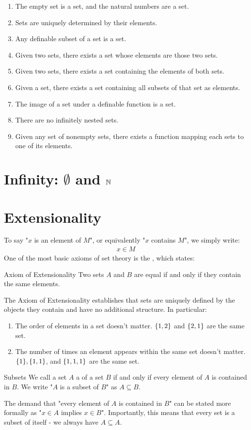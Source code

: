 \begin{enumerate}
	\item The empty set is a set, and the natural numbers are a set.
	\item Sets are uniquely determined by their elements.
	\item Any definable subset of a set is a set.
	\item Given two sets, there exists a set whose elements are those two sets.
	\item Given two sets, there exists a set containing the elements of both sets.
	\item Given a set, there exists a set containing all subsets of that set as elements.
	\item The image of a set under a definable function is a set.
	\item There are no infinitely nested sets.
	\item Given any set of nonempty sets, there exists a function mapping each sets to one of its elements.
\end{enumerate}
\section{Infinity: $\emptyset$ and $\mathbb{N}$}
\section{Extensionality}
To say "$x$ is an element of $M$", or equivalently "$x$ contains $M$", we simply write:
\begin{align*}
	x \in M
\end{align*}
One of the most basic axioms of set theory is the , which states:
\begin{axiom}{Axiom of Extensionality}{}
	Two sets $A$ and $B$ are equal if and only if they contain the same elements.
\end{axiom}
The Axiom of Extensionality establishes that sets are uniquely defined by the objects they contain and have no additional structure. In particular:
\begin{enumerate}
	\item The order of elements in a set doesn't matter. $\qty{1,2}$ and $\qty{2,1}$ are the same set.
	\item The number of times an element appears within the same set doesn't matter. $\qty{1}, \qty{1,1}$, and $\qty{1,1,1}$ are the same set.
\end{enumerate}
\begin{importantdefinition}{Subsets}{}
	We call a set $A$ a  of a set $B$ if and only if every element of $A$ is contained in $B$. We write "$A$ is a subset of $B$" as $A \subseteq B$.
\end{importantdefinition}
The demand that "every element of $A$ is contained in $B$" can be stated more formally as "$x \in A$ implies $x \in B$". Importantly, this means that every set is a subset of itself - we always have $A \subseteq A$.

